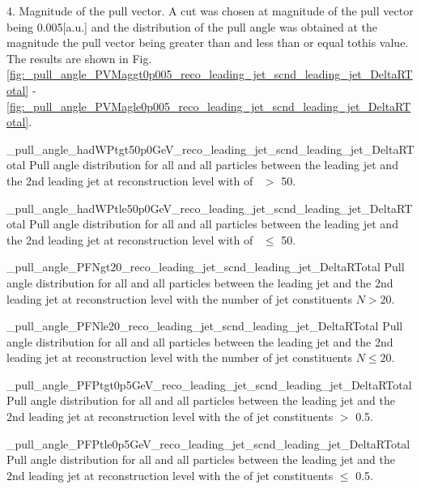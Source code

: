 4. Magnitude of the pull vector.  A cut was chosen at magnitude of the pull vector being 0.005[a.u.] and the distribution of the pull angle was obtained at the magnitude the pull vector being greater than and less than or equal tothis value. The results are shown in Fig. \ref{fig:_pull_angle_PVMaggt0p005_reco_leading_jet_scnd_leading_jet_DeltaRTotal} - \ref{fig:_pull_angle_PVMagle0p005_reco_leading_jet_scnd_leading_jet_DeltaRTotal}.


          {_pull_angle_hadWPtgt50p0GeV_reco_leading_jet_scnd_leading_jet_DeltaRTotal}
          {Pull angle distribution for all \DeltaR and all particles between the leading jet and the 2nd leading jet at reconstruction level with \pt of \PW\ $>$ 50\GeV.}

          {_pull_angle_hadWPtle50p0GeV_reco_leading_jet_scnd_leading_jet_DeltaRTotal}
          {Pull angle distribution for all \DeltaR and all particles between the leading jet and the 2nd leading jet at reconstruction level with \pt of \PW\ $\leq$ 50\GeV.}
          

          {_pull_angle_PFNgt20_reco_leading_jet_scnd_leading_jet_DeltaRTotal}
          {Pull angle distribution for all \DeltaR and all particles between the leading jet and the 2nd leading jet at reconstruction level with the number of jet constituents $N>20$.}

          {_pull_angle_PFNle20_reco_leading_jet_scnd_leading_jet_DeltaRTotal}
          {Pull angle distribution for all \DeltaR and all particles between the leading jet and the 2nd leading jet at reconstruction level with the number of jet constituents $N\leq20$.}

          {_pull_angle_PFPtgt0p5GeV_reco_leading_jet_scnd_leading_jet_DeltaRTotal}
          {Pull angle distribution for all \DeltaR and all particles between the leading jet and the 2nd leading jet at reconstruction level with the \pt of jet constituents $>$ 0.5\GeV.}

          {_pull_angle_PFPtle0p5GeV_reco_leading_jet_scnd_leading_jet_DeltaRTotal}
          {Pull angle distribution for all \DeltaR and all particles between the leading jet and the 2nd leading jet at reconstruction level with the \pt of jet constituents $\leq$ 0.5\GeV.}

